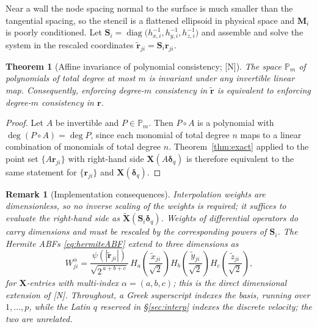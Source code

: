 \documentclass[11pt,a4paper]{article}
\newcommand{\rji}{\bm{r}_{ji}}
\newcommand{\New}{\textcolor{blue!60!black}{\textsf{[N]}}}
\newtheorem{theorem}{Theorem}
\newtheorem{remark}{Remark}
\begin{document}
Near a wall the node spacing normal to the surface is much smaller than the tangential
spacing, so the stencil is a flattened ellipsoid in physical space and $\bm M_i$ is
poorly conditioned. Let
$\bm S_i=\operatorname{diag}\bigl(h_{x,i}^{-1},h_{y,i}^{-1},h_{z,i}^{-1}\bigr)$ and
assemble and solve the system in the rescaled coordinates
$\tilde{\bm r}_{ji}=\bm S_i\rji$.

\begin{theorem}[Affine invariance of polynomial consistency; \New]
\label{thm:affine}
The space $\mathbb P_m$ of polynomials of total degree at most $m$ is invariant under
any invertible linear map. Consequently, enforcing degree-$m$ consistency in
$\tilde{\bm r}$ is equivalent to enforcing degree-$m$ consistency in $\bm r$.
\end{theorem}

\begin{proof}
Let $A$ be invertible and $P\in\mathbb P_m$. Then $P\circ A$ is a polynomial with
$\deg(P\circ A)=\deg P$, since each monomial of total degree $n$ maps to a linear
combination of monomials of total degree $n$. Theorem~\ref{thm:exact} applied to the
point set $\{A\rji\}$ with right-hand side $\bm X(A\bm\delta_q)$ is therefore
equivalent to the same statement for $\{\rji\}$ and $\bm X(\bm\delta_q)$.
\end{proof}

\begin{remark}[Implementation consequences]
Interpolation weights are dimensionless, so no inverse scaling of the weights is
required; it suffices to evaluate the right-hand side as
$\widetilde{\bm X}(\bm S_i\bm\delta_q)$. Weights of differential operators do carry
dimensions and must be rescaled by the corresponding powers of $\bm S_i$. The Hermite
ABFs \eqref{eq:hermiteABF} extend to three dimensions as
\begin{equation}
W^{\alpha}_{ji}=\frac{\psi(|\tilde{\bm r}_{ji}|)}{\sqrt{2^{\,a+b+c}}}\,
H_a\!\left(\frac{\tilde x_{ji}}{\sqrt2}\right)
H_b\!\left(\frac{\tilde y_{ji}}{\sqrt2}\right)
H_c\!\left(\frac{\tilde z_{ji}}{\sqrt2}\right),
\label{eq:hermite3d}
\end{equation}
for $\bm X$-entries with multi-index $\alpha=(a,b,c)$; this is the direct dimensional
extension of \cite[Eq.~(10)]{KL2021} \New. Throughout, a Greek superscript indexes the
\emph{basis}, running over $1,\dots,p$, while the Latin $q$ reserved in
\S\ref{sec:interp} indexes the \emph{discrete velocity}; the two are unrelated.
\end{remark}
\end{document}
